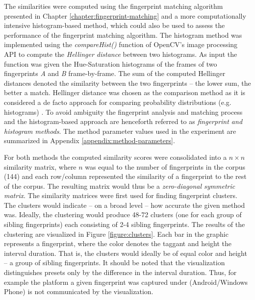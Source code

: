 \documentclass[thesis.tex]{subfiles}
\begin{document}
The similarities were computed using the fingerprint matching algorithm presented in Chapter \ref{chapter:fingerprint-matching} and a more computationally intensive histogram-based method, which could also be used to assess the performance of the fingerprint matching algorithm. The histogram method was implemented using the \emph{compareHist()} function of OpenCV's image processing API to compute the \emph{Hellinger distance} between two histograms. As input the function was given the Hue-Saturation histograms of the frames of two fingerprints \emph{A} and \emph{B} frame-by-frame. The sum of the computed Hellinger distances denoted the similarity between the two fingerprints -- the lower sum, the better a match. Hellinger distance was chosen as the comparison method as it is considered a de facto approach for comparing probability distributions (e.g. histograms) \cite{hellinger}. To avoid ambiguity the fingerprint analysis and matching process and the histogram-based approach are henceforth referred to as \emph{fingerprint and histogram methods}. The method parameter values used in the experiment are summarized in Appendix \ref{appendix:method-parameters}.

For both methods the computed similarity scores were consolidated into a $n\times n$ similarity matrix, where $n$ was equal to the number of fingerprints in the corpus (144) and each row/column represented the similarity of a fingerprint to the rest of the corpus. The resulting matrix would thus be a \emph{zero-diagonal symmetric matrix}. The similarity matrices were first used for finding fingerprint clusters. The clusters would indicate -- on a broad level -- how accurate the given method was. Ideally, the clustering would produce 48-72 clusters (one for each group of sibling fingerprints) each consisting of 2-4 sibling fingerprints. The results of the clustering are visualized in Figure \ref{figure:clusters}. Each bar in the graphic represents a fingerprint, where the color denotes the taggant and height the interval duration. That is, the clusters would ideally be of equal color and height -- a group of sibling fingerprints. It should be noted that the visualization distinguishes presets only by the difference in the interval duration. Thus, for example the platform a given fingerprint was captured under (Android/Windows Phone) is not communicated by the visualization.
\end{document}

